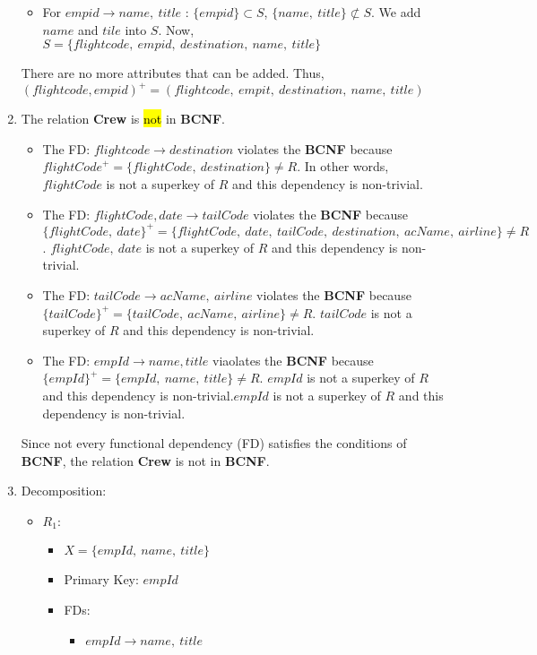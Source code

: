 \documentclass[12pt]{article}
\begin{document}
\begin{enumerate}
\begin{itemize}
        \item For $empid \rightarrow name,\ title$ : $\{empid\} \subset S$, $\{name,\ title\} \not\subset S$. We add $name$ and $tile$ into $S$. Now, $S = \{flightcode,\ empid,\ destination,\ name,\ title\}$
      \end{itemize}

      There are no more attributes that can be added. Thus, $(flightcode,empid)^+ = (flightcode,\ empit,\ destination,\ name,\ title)$ 


    \item The relation \textbf{Crew} is \hl{not} in \textbf{BCNF}.
      \begin{itemize}
        \item The FD: $flightcode \rightarrow destination$ violates the \textbf{BCNF} because ${flightCode}^+ = \{flightCode,\ destination\} \neq R$. In other words, $flightCode$ is not a superkey of $R$ and this dependency is non-trivial.

        \item The FD: $flightCode, date \rightarrow tailCode$ violates the \textbf{BCNF} because $\{flightCode,\ date\}^+ = \{flightCode,\ date,\ tailCode,\ destination,\ acName,\ airline\} \neq R$. $flightCode,\ date$ is not a superkey of $R$ and this dependency is non-trivial.

        \item The FD: $tailCode \rightarrow acName,\ airline$ violates the \textbf{BCNF} because $\{tailCode\}^+ = \{tailCode,\ acName,\ airline\} \neq R$. $tailCode$ is not a superkey of $R$ and this dependency is non-trivial.

        \item The FD: $empId \rightarrow name, title$ viaolates the \textbf{BCNF} because $\{empId\}^+ = \{empId,\ name,\ title\} \neq R$. $empId$ is not a superkey of $R$ and this dependency is non-trivial.$empId$ is not a superkey of $R$ and this dependency is non-trivial.

      \end{itemize}
      Since not every functional dependency (FD) satisfies the conditions of \textbf{BCNF}, the relation \textbf{Crew} is not in \textbf{BCNF}.

      \item Decomposition:

      \begin{itemize}
        \item $R_1:$
          \begin{itemize}
            \item $X = \{empId,\ name,\ title\}$
            \item Primary Key: $empId$
            \item FDs:
              \begin{itemize}
                \item $empId \rightarrow name,\ title$
              \end{itemize}
          \end{itemize}


\end{itemize}
\end{enumerate}
\end{document}
